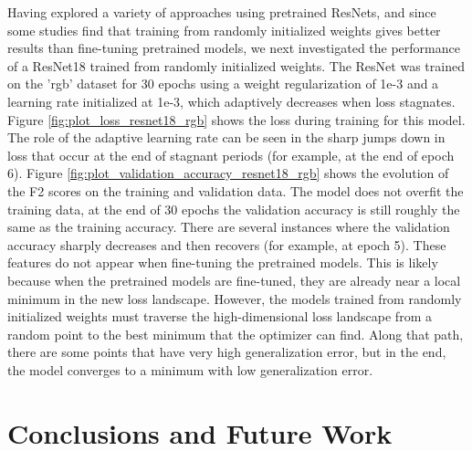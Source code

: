 \documentclass[10pt,twocolumn,letterpaper]{article}
\begin{document}
Having explored a variety of approaches using pretrained ResNets, and since some studies find that training from randomly initialized weights gives better results than fine-tuning pretrained models,\cite{fromscratch2} we next investigated the performance of a ResNet18 trained from randomly initialized weights. The ResNet was trained on the 'rgb' dataset for 30 epochs using a weight regularization of 1e-3 and a learning rate initialized at 1e-3, which adaptively decreases when loss stagnates. Figure \ref{fig:plot_loss_resnet18_rgb} shows the loss during training for this model. The role of the adaptive learning rate can be seen in the sharp jumps down in loss that occur at the end of stagnant periods (for example, at the end of epoch 6). Figure \ref{fig:plot_validation_accuracy_resnet18_rgb} shows the evolution of the F2 scores on the training and validation data. The model does not overfit the training data, at the end of 30 epochs the validation accuracy is still roughly the same as the training accuracy. There are several instances where the validation accuracy sharply decreases and then recovers (for example, at epoch 5). These features do not appear when fine-tuning the pretrained models. This is likely because when the pretrained models are fine-tuned, they are already near a local minimum in the new loss landscape. However, the models trained from randomly initialized weights must traverse the high-dimensional loss landscape from a random point to the best minimum that the optimizer can find. Along that path, there are some points that have very high generalization error, but in the end, the model converges to a minimum with low generalization error.


\section{Conclusions and Future Work}
\end{document}
